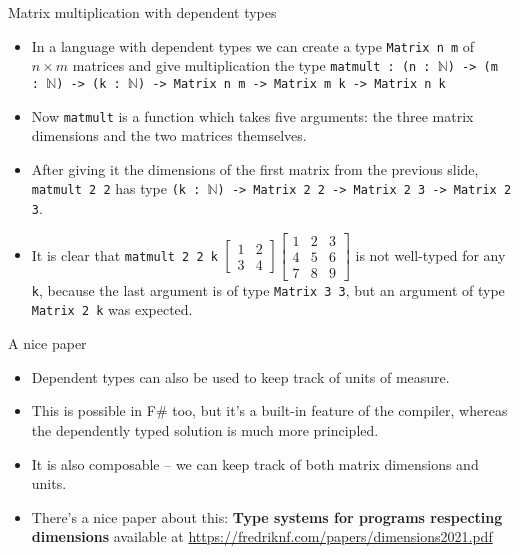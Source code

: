 \documentclass{beamer}
\newcommand{\m}[1]{\texttt{#1}}
\begin{document}
\begin{frame}{Matrix multiplication with dependent types}
\begin{itemize}
	\item In a language with dependent types we can create a type \m{Matrix n m} of $n \times m$ matrices and give multiplication the type \m{matmult : (n :\ $\mathbb{N}$) ->  (m :\ $\mathbb{N}$) -> (k :\ $\mathbb{N}$) -> Matrix n m -> Matrix m k -> Matrix n k}
	\item Now \m{matmult} is a function which takes five arguments: the three matrix dimensions and the two matrices themselves.
	\item After giving it the dimensions of the first matrix from the previous slide, \m{matmult 2 2} has type \m{(k :\ $\mathbb{N}$) -> Matrix 2 2 -> Matrix 2 3 -> Matrix 2 3}.
	\item It is clear that \m{matmult 2 2 k} $\begin{bmatrix}1 & 2\\3 & 4\end{bmatrix} \begin{bmatrix}1 & 2 & 3\\4 & 5 & 6\\7 & 8 & 9\end{bmatrix}$ is not well-typed for any \m{k}, because the last argument is of type \m{Matrix 3 3}, but an argument of type \m{Matrix 2 k} was expected.
\end{itemize}
\end{frame}

\begin{frame}{A nice paper}
\begin{itemize}
	\item Dependent types can also be used to keep track of units of measure.
	\item This is possible in F\# too, but it's a built-in feature of the compiler, whereas the dependently typed solution is much more principled.
	\item It is also composable -- we can keep track of both matrix dimensions and units.
	\item There's a nice paper about this: \textbf{Type systems for programs respecting dimensions} available at \url{https://fredriknf.com/papers/dimensions2021.pdf}
\end{itemize}
\end{frame}
\end{document}
